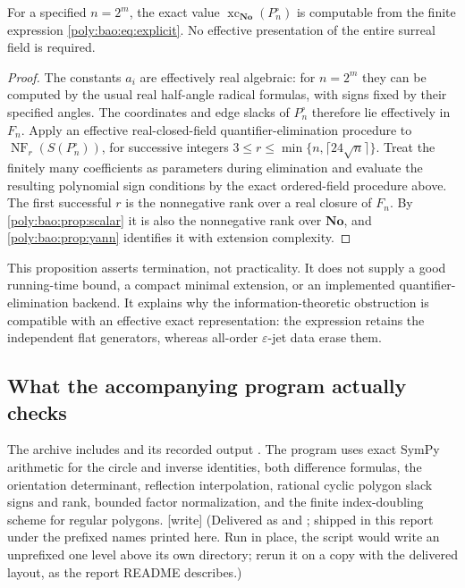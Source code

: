\documentclass[11pt,a4paper]{article}
\numberwithin{equation}{section}
\theoremstyle{plain}
\newcommand{\wtag}{\textup{[write]}}%
\newcommand{\No}{\mathbf{No}}
\newcommand{\eps}{\varepsilon}
\newcommand{\xc}{\operatorname{xc}}
\newcommand{\NF}{\operatorname{NF}}
\begin{document}
\begin{proposition}
\label{poly:bao:prop:algorithm}
For a specified $n=2^m$, the exact value $\xc_{\No}(P^\circ_n)$ is computable
from the finite expression \eqref{poly:bao:eq:explicit}. No effective presentation
of the entire surreal field is required.
\end{proposition}
\begin{proof}
The constants $a_i$ are effectively real algebraic: for $n=2^m$ they
can be computed by the usual real half-angle radical formulas, with signs
fixed by their specified angles. The coordinates and edge slacks of $P^\circ_n$
therefore lie effectively in $F_n$. Apply an effective
real-closed-field quantifier-elimination procedure \cite{bao:Tarski,bao:Collins}
to $\NF_r(S(P^\circ_n))$, for successive integers
$3\leq r\leq\min\{n,\lceil24\sqrt n\rceil\}$. Treat the finitely
many coefficients as parameters during elimination and evaluate the
resulting polynomial sign conditions by the exact ordered-field
procedure above. The first successful $r$ is the nonnegative rank over
a real closure of $F_n$. By \cref{poly:bao:prop:scalar} it is also the nonnegative
rank over $\No$, and \cref{poly:bao:prop:yann} identifies it with extension
complexity.
\end{proof}

This proposition asserts termination, not practicality. It does not
supply a good running-time bound, a compact minimal extension, or an
implemented quantifier-elimination backend. It explains why the
information-theoretic obstruction is compatible with an effective exact
representation: the expression retains the independent flat generators,
whereas all-order $\eps$-jet data erase them.

\subsection{What the accompanying program actually checks}
The archive includes  and its recorded output
. The program uses exact SymPy arithmetic
for the circle and inverse identities, both difference formulas, the
orientation determinant, reflection interpolation, rational cyclic
polygon slack signs and rank, bounded factor normalization, and the
finite index-doubling scheme for regular polygons.
\wtag{} (Delivered as  and
; shipped in this report under the prefixed
names printed here. Run in place, the script would write an unprefixed
 one level above its own directory; rerun
it on a copy with the delivered layout, as the report README describes.)
\end{document}
